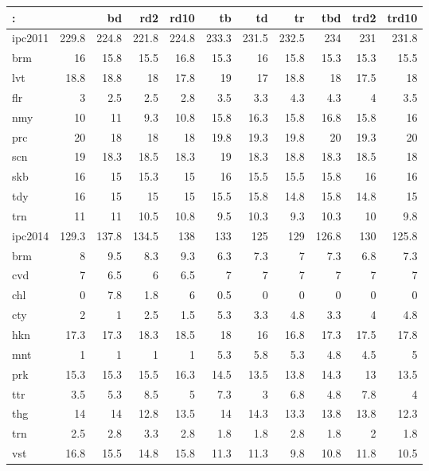 \begin{center}
\begin{tabular}{lrrrrrrrrrr}
: &  & bd & rd2 & rd10 & tb & td & tr & tbd & trd2 & trd10\\
\hline
ipc2011 & 229.8 & 224.8 & 221.8 & 224.8 & 233.3 & 231.5 & 232.5 & 234 & 231 & 231.8\\
\hline
brm & 16 & 15.8 & 15.5 & 16.8 & 15.3 & 16 & 15.8 & 15.3 & 15.3 & 15.5\\
lvt & 18.8 & 18.8 & 18 & 17.8 & 19 & 17 & 18.8 & 18 & 17.5 & 18\\
flr & 3 & 2.5 & 2.5 & 2.8 & 3.5 & 3.3 & 4.3 & 4.3 & 4 & 3.5\\
nmy & 10 & 11 & 9.3 & 10.8 & 15.8 & 16.3 & 15.8 & 16.8 & 15.8 & 16\\
prc & 20 & 18 & 18 & 18 & 19.8 & 19.3 & 19.8 & 20 & 19.3 & 20\\
scn & 19 & 18.3 & 18.5 & 18.3 & 19 & 18.3 & 18.8 & 18.3 & 18.5 & 18\\
skb & 16 & 15 & 15.3 & 15 & 16 & 15.5 & 15.5 & 15.8 & 16 & 16\\
tdy & 16 & 15 & 15 & 15 & 15.5 & 15.8 & 14.8 & 15.8 & 14.8 & 15\\
trn & 11 & 11 & 10.5 & 10.8 & 9.5 & 10.3 & 9.3 & 10.3 & 10 & 9.8\\
\hline
ipc2014 & 129.3 & 137.8 & 134.5 & 138 & 133 & 125 & 129 & 126.8 & 130 & 125.8\\
\hline
brm & 8 & 9.5 & 8.3 & 9.3 & 6.3 & 7.3 & 7 & 7.3 & 6.8 & 7.3\\
cvd & 7 & 6.5 & 6 & 6.5 & 7 & 7 & 7 & 7 & 7 & 7\\
chl & 0 & 7.8 & 1.8 & 6 & 0.5 & 0 & 0 & 0 & 0 & 0\\
cty & 2 & 1 & 2.5 & 1.5 & 5.3 & 3.3 & 4.8 & 3.3 & 4 & 4.8\\
hkn & 17.3 & 17.3 & 18.3 & 18.5 & 18 & 16 & 16.8 & 17.3 & 17.5 & 17.8\\
mnt & 1 & 1 & 1 & 1 & 5.3 & 5.8 & 5.3 & 4.8 & 4.5 & 5\\
prk & 15.3 & 15.3 & 15.5 & 16.3 & 14.5 & 13.5 & 13.8 & 14.3 & 13 & 13.5\\
ttr & 3.5 & 5.3 & 8.5 & 5 & 7.3 & 3 & 6.8 & 4.8 & 7.8 & 4\\
thg & 14 & 14 & 12.8 & 13.5 & 14 & 14.3 & 13.3 & 13.8 & 13.8 & 12.3\\
trn & 2.5 & 2.8 & 3.3 & 2.8 & 1.8 & 1.8 & 2.8 & 1.8 & 2 & 1.8\\
vst & 16.8 & 15.5 & 14.8 & 15.8 & 11.3 & 11.3 & 9.8 & 10.8 & 11.8 & 10.5\\
\end{tabular}
\end{center}



